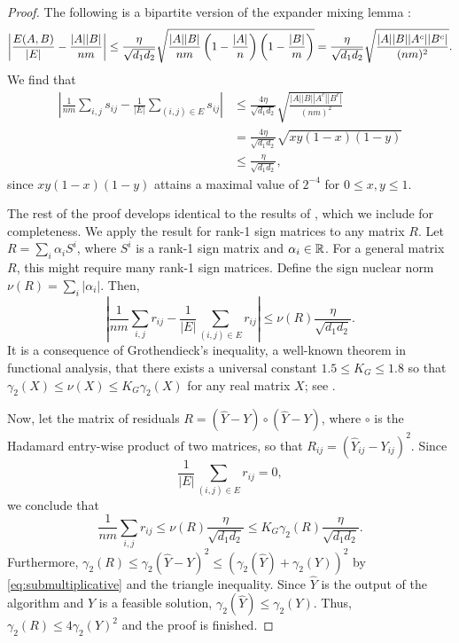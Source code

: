 \begin{proof}
The following is a bipartite version of the expander mixing lemma 
\citep*{dewinter2012}:
\[
\left| \frac{E(A,B)}{|E|} - \frac{|A||B|}{n m} \right|
\leq 
\frac{\eta}{\sqrt{d_1 d_2}} 
\sqrt{\frac{|A||B|}{nm} 
\left(1- \frac{|A|}{n} \right) \left( 1- \frac{|B|}{m} \right) } \\
= 
\frac{\eta}{\sqrt{d_1 d_2}} 
\sqrt{\frac{|A||B||A^c||B^c|}{(nm)^2}} .
\]
We find that
\begin{align*}
\left| \frac{1}{n m} \sum_{i,j} s_{ij} - 
\frac{1}{|E|} \sum_{(i,j) \in E} s_{ij} \right|
& \leq 
\frac{4 \eta}{\sqrt{d_1 d_2}}
\sqrt{\frac{|A||B||A^c||B^c|}{(nm)^2}}
\\
& = \frac{4 \eta}{\sqrt{d_1 d_2}}
\sqrt{ x y (1-x) (1-y) }\\
& \leq \frac{\eta}{\sqrt{d_1 d_2}},
\end{align*}
since $x y (1-x) (1-y)$ attains a maximal value of $2^{-4}$ 
for $0 \leq x,y \leq 1$.

The rest of the proof develops identical to the results of \citet*{heiman2014},
which we include for completeness.
We apply the result for rank-1 sign matrices to any matrix $R$.
Let $R = \sum_i \alpha_i S^i$, where $S^i$ is a rank-1 sign matrix and $\alpha_i \in \operatorname{\mathbb{R}}$.
For a general matrix $R$, this might require many rank-1 sign matrices.
Define the sign nuclear norm $\nu (R) = \sum_i |\alpha_i|$. 
Then,
\[
\left| \frac{1}{n m} \sum_{i,j} r_{ij} - 
\frac{1}{|E|} \sum_{(i,j) \in E} r_{ij} \right|
\leq
\nu(R) \frac{\eta}{\sqrt{d_1 d_2}} .
\]
It is a consequence of Grothendieck's inequality,
a well-known theorem in functional analysis,
that there exists a universal constant 
$1.5 \leq K_G \leq 1.8$ 
so that
$\gamma_2 (X) \leq \nu(X) \leq K_G \gamma_2(X)$
for any real matrix $X$; see \citet*{heiman2014}.

Now, let the matrix of residuals 
$R = (\hat{Y}-Y) \circ (\hat{Y} - Y)$, where $\circ$ is the 
Hadamard entry-wise product of two matrices,
so that $R_{ij} = (\hat{Y}_{ij} - Y_{ij})^2$.
Since 
\[
\frac{1}{|E|} \sum_{(i,j) \in E} r_{ij} = 0 ,
\]
we conclude that 
\[
\frac{1}{n m} \sum_{i,j} r_{ij} 
\leq
\nu(R) \frac{\eta}{\sqrt{d_1 d_2}} 
\leq 
K_G \gamma_2(R) \frac{\eta}{\sqrt{d_1 d_2}}.
\]
Furthermore, $\gamma_2 (R) \leq \gamma_2 (\hat{Y}-Y)^2 \leq ( \gamma_2(\hat{Y}) + \gamma_2(Y) ) ^2 $
by \eqref{eq:submultiplicative} and the triangle inequality.
Since $\hat{Y}$ is the output of the algorithm and $Y$ is a feasible solution,
$\gamma_2 (\hat{Y}) \leq \gamma_2 (Y)$.
Thus, $\gamma_2(R) \leq 4 \gamma_2(Y)^2$ and the proof is finished.
\end{proof}

